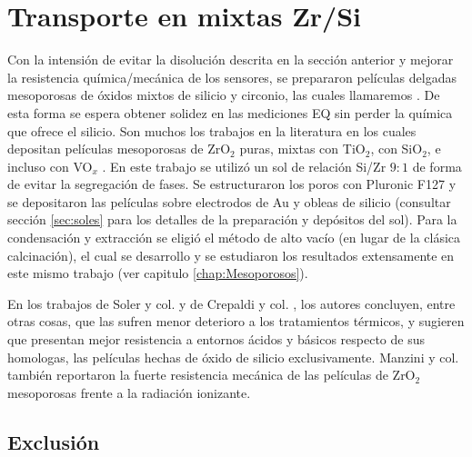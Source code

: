 

	\section{Transporte en \pdm\space mixtas Zr/Si}

			Con la intensión de evitar la disolución descrita en la sección anterior y mejorar la resistencia química/mecánica de los sensores, se prepararon películas delgadas mesoporosas de óxidos mixtos de silicio y circonio, las cuales llamaremos \pdmZ. De esta forma se espera obtener solidez en las mediciones EQ sin perder la química que ofrece el silicio. Son muchos los trabajos en la literatura en los cuales depositan películas mesoporosas de ZrO$_2$ puras, mixtas con TiO$_2$, con SiO$_2$, e incluso con VO$_x$ \cite{Soler-Illia2004,Crepaldi2002a,Gimenez2016,Zelcer2013,Calvo20210,Angelome2008}. En este trabajo se utilizó un sol de relación Si/Zr $9\!:\!1$ de forma de evitar la segregación de fases\cite{Soler-Illia2004}. Se estructuraron los poros con Pluronic F127 y se depositaron las películas sobre electrodos de Au y obleas de silicio (consultar sección \ref{sec:soles} para los detalles de la preparación y depósitos del sol). Para la condensación y extracción se eligió el método de alto vacío (en lugar de la clásica calcinación), el cual se desarrollo y se estudiaron los resultados extensamente en este mismo trabajo (ver capitulo \ref{chap:Mesoporosos}).

			En los trabajos de Soler y col. y de Crepaldi y col. \cite{Soler-Illia2004,Crepaldi2002a}, los autores concluyen, entre otras cosas, que las \pdmZ\space sufren menor deterioro a los tratamientos térmicos, y sugieren que presentan mejor resistencia a entornos ácidos y básicos respecto de sus homologas, las películas hechas de óxido de silicio exclusivamente. Manzini y col.\cite{Gimenez2016} también reportaron la fuerte resistencia mecánica de las películas de ZrO$_2$ mesoporosas frente a la radiación ionizante.

	 \subsection{Exclusión}

